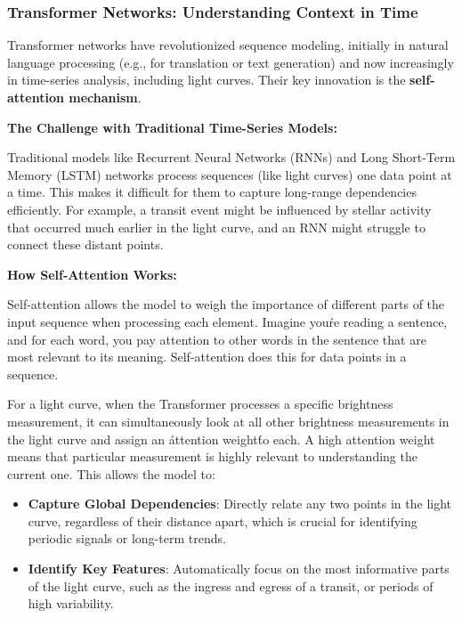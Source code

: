 \documentclass{article}
\begin{document}
\subsubsection{Transformer Networks: Understanding Context in Time}

Transformer networks have revolutionized sequence modeling, initially in natural language processing (e.g., for translation or text generation) and now increasingly in time-series analysis, including light curves. Their key innovation is the \textbf{self-attention mechanism}.

\textbf{The Challenge with Traditional Time-Series Models:}

Traditional models like Recurrent Neural Networks (RNNs) and Long Short-Term Memory (LSTM) networks process sequences (like light curves) one data point at a time. This makes it difficult for them to capture long-range dependencies efficiently. For example, a transit event might be influenced by stellar activity that occurred much earlier in the light curve, and an RNN might struggle to connect these distant points.

\textbf{How Self-Attention Works:}

Self-attention allows the model to weigh the importance of different parts of the input sequence when processing each element. Imagine you\'re reading a sentence, and for each word, you pay attention to other words in the sentence that are most relevant to its meaning. Self-attention does this for data points in a sequence.

For a light curve, when the Transformer processes a specific brightness measurement, it can simultaneously look at all other brightness measurements in the light curve and assign an \'attention weight\' to each. A high attention weight means that particular measurement is highly relevant to understanding the current one. This allows the model to:

\begin{itemize}
    \item \textbf{Capture Global Dependencies}: Directly relate any two points in the light curve, regardless of their distance apart, which is crucial for identifying periodic signals or long-term trends.
    \item \textbf{Identify Key Features}: Automatically focus on the most informative parts of the light curve, such as the ingress and egress of a transit, or periods of high variability.
\end{itemize}
\end{document}
